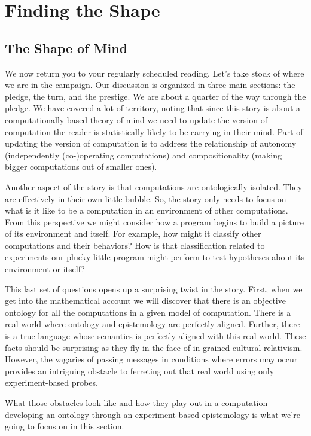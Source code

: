 \chapter{Finding the Shape}
\label{chap:pledge-ch3}

\section{The Shape of Mind}
\label{sec:pledge-vii}

We now return you to your regularly scheduled reading. Let's take stock of where we are in the campaign. Our discussion is organized in three main sections: the pledge, the turn, and the prestige. We are about a quarter of the way through the pledge. We have covered a lot of territory, noting that since this story is about a computationally based theory of mind we need to update the version of computation the reader is statistically likely to be carrying in their mind. Part of updating the version of computation is to address the relationship of autonomy (independently (co-)operating computations) and compositionality (making bigger computations out of smaller ones).

Another aspect of the story is that computations are ontologically isolated. They are effectively in their own little bubble. So, the story only needs to focus on what is it like to be a computation in an environment of other computations. From this perspective we might consider how a program begins to build a picture of its environment and itself. For example, how might it classify other computations and their behaviors? How is that classification related to experiments our plucky little program might perform to test hypotheses about its environment or itself?

This last set of questions opens up a surprising twist in the story. First, when we get into the mathematical account we will discover that there is an objective ontology for all the computations in a given model of computation. There is a real world where ontology and epistemology are perfectly aligned. Further, there is a true language whose semantics is perfectly aligned with this real world. These facts should be surprising as they fly in the face of in-grained cultural relativism. However, the vagaries of passing messages in conditions where errors may occur provides an intriguing obstacle to ferreting out that real world using only experiment-based probes.

What those obstacles look like and how they play out in a computation developing an ontology through an experiment-based epistemology is what we're going to focus on in this section. 

